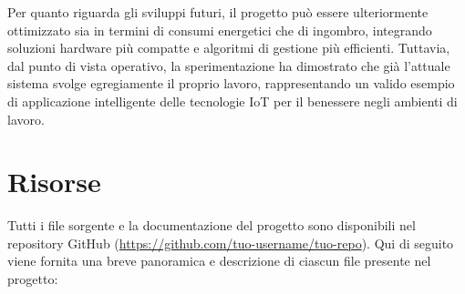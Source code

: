 \documentclass[fleqn,10pt]{SelfArx} %
\begin{document}
Per quanto riguarda gli sviluppi futuri, il progetto può essere ulteriormente ottimizzato sia in termini di consumi energetici che di ingombro, integrando soluzioni hardware più compatte e algoritmi di gestione più efficienti. Tuttavia, dal punto di vista operativo, la sperimentazione ha dimostrato che già l'attuale sistema svolge egregiamente il proprio lavoro, rappresentando un valido esempio di applicazione intelligente delle tecnologie IoT per il benessere negli ambienti di lavoro. \newline


%
%

\section{Risorse}

Tutti i file sorgente e la documentazione del progetto sono disponibili nel repository GitHub (\url{https://github.com/tuo-username/tuo-repo}).  
Qui di seguito viene fornita una breve panoramica e descrizione di ciascun file presente nel progetto:
\end{document}
